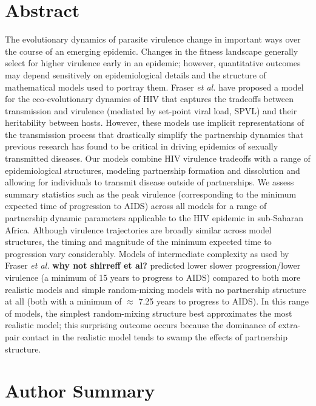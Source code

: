 \documentclass[10pt,letterpaper]{article}
\newcommand{\todo}[1]{\textbf{#1}}
\begin{document}
\section*{Abstract}
The evolutionary dynamics of parasite virulence change
in important ways over the
course of an emerging epidemic.
Changes in the fitness landscape
generally select for higher virulence early in an
epidemic; however, quantitative outcomes
may depend sensitively on epidemiological details and the structure of
mathematical models used to portray them.  Fraser \emph{et al.} 
have proposed a model for the eco-evolutionary
dynamics of HIV that captures
the tradeoffs between transmission and virulence (mediated by
set-point viral load, SPVL) and their heritability between
hosts. However, these models use implicit
representations of the transmission process that drastically simplify the
partnership dynamics that previous research has found to be critical
in driving epidemics of sexually transmitted diseases.  
Our models combine HIV virulence tradeoffs with a range of
epidemiological structures, modeling partnership formation and
dissolution and allowing for individuals to transmit disease outside
of partnerships. We assess summary statistics such as the peak virulence
(corresponding to the minimum expected time of progression to AIDS) across all
models for a range of 
partnership dynamic parameters 
applicable to the HIV epidemic in sub-Saharan Africa.
Although virulence trajectories are broadly similar
across model structures, the timing and magnitude of the 
minimum expected time to progression vary
considerably.
Models of intermediate
complexity as used by Fraser \emph{et al.} \todo{why not shirreff et al?} 
predicted lower slower progression/lower virulence (a minimum of 15 years to
progress to AIDS) compared to both more realistic models
and simple random-mixing models with no partnership structure
at all (both with a minimum of $\approx$ 7.25 years to progress to AIDS).
In this range of models, the simplest random-mixing structure best
approximates the most realistic model; this
surprising outcome occurs because the dominance of extra-pair
contact in the realistic model tends to swamp the effects of
partnership structure.

\section*{Author Summary}
\end{document}
